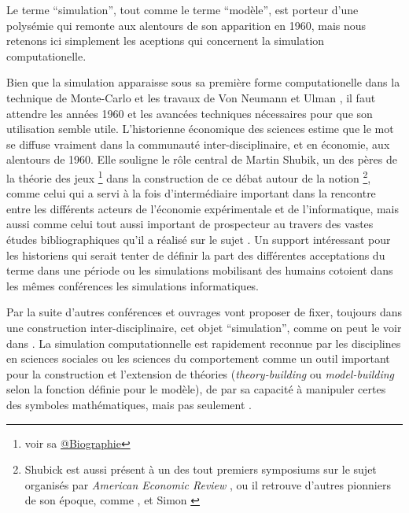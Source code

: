 Le terme \enquote{simulation}, tout comme le terme \enquote{modèle}, est porteur d'une polysémie qui remonte aux alentours de son apparition en 1960, mais nous retenons ici simplement les aceptions qui concernent la simulation computationelle. 

Bien que la simulation apparaisse sous sa première forme computationelle dans la technique de Monte-Carlo et les travaux de Von Neumann et Ulman \autocite{Eckhardt1987}, il faut attendre les années 1960 et les avancées techniques nécessaires pour que son utilisation semble utile. L'historienne économique des sciences \textcite{Morgan2004} estime que le mot se diffuse vraiment dans la communauté inter-disciplinaire, et en économie, aux alentours de 1960. Elle souligne le rôle central de Martin Shubik, un des pères de la théorie des jeux \footnote{voir sa \href{http://blogs.library.duke.edu/rubenstein/2012/12/18/the-martin-shubik-papers-from-early-game-theory-to-the-strategic-analysis-of-war/}{@Biographie}} dans la construction de ce débat autour de la notion \footnote{Shubick est aussi présent à un des tout premiers symposiums sur le sujet organisés par \textit{American Economic Review} \autocite{Shubik1960b}, ou il retrouve d'autres pionniers de son époque, comme \textcite{Orcutt1960}, et Simon \autocite{Clarkson1960}}, comme celui qui a servi à la fois d'intermédiaire important dans la rencontre entre les différents acteurs de l'économie expérimentale et de l'informatique, mais aussi comme celui tout aussi important de prospecteur au travers des vastes études bibliographiques qu'il a réalisé sur le sujet \autocite{Shubik1960a} \autocite{Shubik1972}. Un support intéressant pour les historiens qui serait tenter de définir la part des différentes acceptations du terme dans une période ou les simulations mobilisant des humains cotoient dans les mêmes conférences les simulations informatiques.

Par la suite d'autres conférences et ouvrages vont proposer de fixer, toujours dans une construction inter-disciplinaire, cet objet \enquote{simulation}, comme on peut le voir dans \autocite{Guetzkow1962, Guetzkow1972,Dutton1971}. La simulation computationnelle est rapidement reconnue par les disciplines en sciences sociales ou les sciences du comportement comme un outil important pour la construction et l'extension de théories (\textit{theory-building} ou \textit{model-building} selon la fonction définie pour le modèle), de par sa capacité à manipuler certes des symboles mathématiques, mais pas seulement \autocite[924-325]{Clarkson1960}. 

